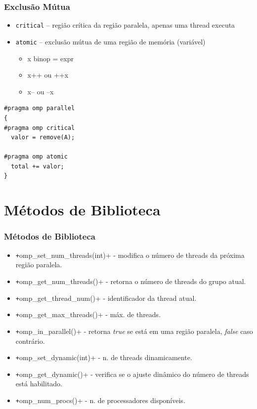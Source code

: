 \documentclass[xcolor={usenames,dvipsnames},12pt,presentation,aspectratio=169]{beamer}
\begin{document}
\begin{frame}[fragile]
  \frametitle{Exclusão Mútua}
  \begin{itemize}
  \item \texttt{critical} -- região crítica da região paralela, apenas uma thread executa
  \pause
  \item \texttt{atomic} -- exclusão mútua de uma região de memória (variável)
    \begin{itemize}
    \item x binop = expr
    \item x++ ou ++x
    \item x-- ou --x
    \end{itemize}
  \end{itemize}
  \pause
\begin{minipage}{0.95\textwidth}  
\begin{verbatim}  
#pragma omp parallel
{
#pragma omp critical
  valor = remove(A);

#pragma omp atomic
  total += valor;
}
\end{verbatim}
\end{minipage}
\end{frame}
\section{Métodos de Biblioteca}
\begin{frame}[fragile]
  \frametitle{Métodos de Biblioteca}
  \begin{itemize}[<+->]
  \item \texttt+omp_set_num_threads(int)+ - modifica o número de threads da próxima região paralela.
  \item \texttt+omp_get_num_threads()+ - retorna o número de threads do grupo atual.
  \item \texttt+omp_get_thread_num()+ - identificador da thread atual.
  \item \texttt+omp_get_max_threads()+ - máx. de threads.
  \item \texttt+omp_in_parallel()+ - retorna \emph{true} se está em uma região paralela, \emph{false} caso contrário.
  \item \texttt+omp_set_dynamic(int)+ - n. de threads dinamicamente.
  \item \texttt+omp_get_dynamic()+ - verifica se o ajuste dinâmico do número de threads está habilitado.
  \item \texttt+omp_num_procs()+ - n. de processadores disponíveis.
  \end{itemize}
\end{frame}
\end{document}
